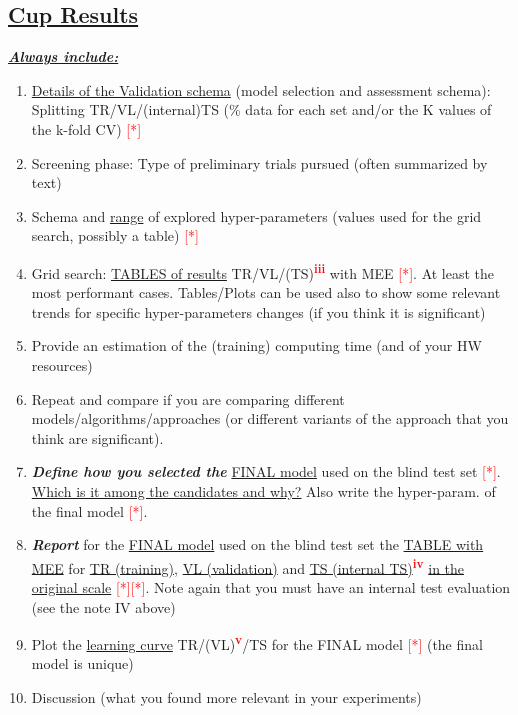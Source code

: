 \documentclass[12pt, letterpaper]{article}  %
\begin{document}
\subsection{\underline{Cup Results}}
\underline{\textbf{\textit{Always include:}}}
\begin{enumerate}
    \setlength\itemsep{-0.25em}
    \item \underline{Details of the Validation schema} (model selection and assessment schema): Splitting  TR/VL/(internal)TS (\% data for each set and/or the K values of the k-fold CV)  \textcolor{red}{[*]}
    \item Screening phase: Type of preliminary trials pursued (often summarized by text) 
    \item Schema and \underline{range} of explored hyper-parameters (values used for the grid search, possibly a table) \textcolor{red}{[*]}
    \item Grid search: \underline{TABLES of results} TR/VL/(TS)\textsuperscript{\textbf{\textcolor{red}{iii}}} with MEE \textcolor{red}{[*]}. At least the most performant cases. Tables/Plots can be used also to show some relevant trends for specific hyper-parameters changes (if you think it is significant) 
    \item Provide an estimation of the (training) computing time (and of your HW resources)
    \item Repeat and compare if you are comparing different models/algorithms/approaches (or different variants of the approach that you think are significant). 
    \item \textbf{\textit{Define how you selected the}} \underline{FINAL model} used on the blind test set \textcolor{red}{[*]}. \underline{Which is it among the candidates and why?} Also write the  hyper-param. of the final model \textcolor{red}{[*]}.
    \item \textbf{\textit{Report}} for the \underline{FINAL model} used on the blind test set the \underline{TABLE with MEE} for \underline{TR (training)}, \underline{VL (validation)} and \underline{TS (internal TS)}\textsuperscript{\textbf{\textcolor{red}{iv}}} \underline{in the original scale} \textcolor{red}{[*]}\textcolor{red}{[*]}. Note again  that you must have an internal  test evaluation (see the note IV above)
    \item Plot the \underline{learning curve} TR/(VL)\textsuperscript{\textbf{\textcolor{red}{v}}}/TS for the FINAL model \textcolor{red}{[*]} (the final model is unique) 
    \item Discussion (what you found more relevant in your experiments)
\end{enumerate}
\end{document}
